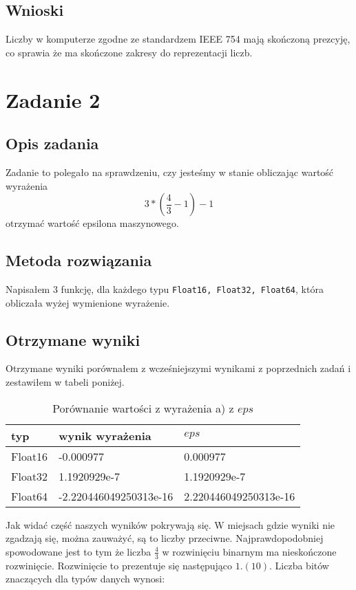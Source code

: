 \documentclass{article}
\begin{document}
\subsection{Wnioski}

Liczby w komputerze zgodne ze standardzem IEEE 754 mają skończoną prezcyję, co sprawia że ma skończone zakresy do reprezentacji liczb.

\section{Zadanie 2}

\subsection{Opis zadania}

Zadanie to polegało na sprawdzeniu, czy jesteśmy w stanie obliczając wartość wyrażenia $$\left. 3 * (\frac{4}{3} - 1)-1 \right.$$ otrzymać wartość epsilona maszynowego.

\subsection{Metoda rozwiązania}

Napisałem 3 funkcję, dla każdego typu \texttt{Float16, Float32, Float64}, która obliczała wyżej wymienione wyrażenie.

\subsection{Otrzymane wyniki}

Otrzymane wyniki porównałem z wcześniejszymi wynikami z poprzednich zadań i zestawiłem w tabeli poniżej.

\begin{table}[h!]
    \centering
    \begin{tabular}{|l|l|l|}
     \hline
     typ & wynik wyrażenia & \(eps\)  \\
     \hline
     Float16 & -0.000977 & 0.000977 \\
     Float32 & 1.1920929e-7 & 1.1920929e-7 \\
     Float64 & -2.220446049250313e-16 & 2.220446049250313e-16 \\
     \hline
    \end{tabular}
    \caption{Porównanie wartości z wyrażenia a) z \(eps\)}
    \label{table:6}
\end{table}

Jak widać część naszych wyników pokrywają się. W miejsach gdzie wyniki nie zgadzają się, można zauważyć, są to liczby przeciwne. Najprawdopodobniej spowodowane jest to tym że liczba \(\frac{4}{3}\) w rozwinięciu binarnym ma nieskończone rozwinięcie. Rozwinięcie to prezentuje się następująco \(1.(10)\). Liczba bitów znaczących dla typów danych wynosi:
\end{document}
